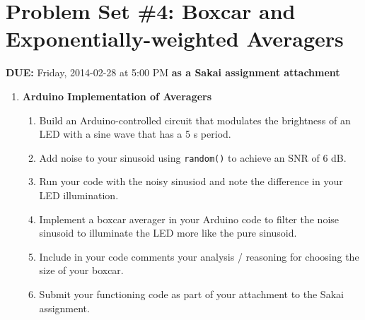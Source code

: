 


\section*{Problem Set \#4: Boxcar and Exponentially-weighted Averagers}

\textbf{DUE:} Friday, 2014-02-28 at 5:00 PM \textbf{as a Sakai assignment attachment}

\begin{enumerate}





\item \textbf{Arduino Implementation of Averagers}
    \begin{enumerate}
        \item Build an Arduino-controlled circuit that modulates the brightness
            of an LED with a sine wave that has a 5 s period.
        \item Add noise to your sinusoid using \verb+random()+ to achieve an
            SNR of 6 dB.
        \item Run your code with the noisy sinusiod and note the difference in
            your LED illumination.
        \item Implement a boxcar averager in your Arduino code to filter the
            noise sinusoid to illuminate the LED more like the pure sinusoid.
        \item Include in your code comments your analysis / reasoning for
            choosing the size of your boxcar.
        \item Submit your functioning code as part of your attachment to the
            Sakai assignment.
    \end{enumerate}

\end{enumerate}


